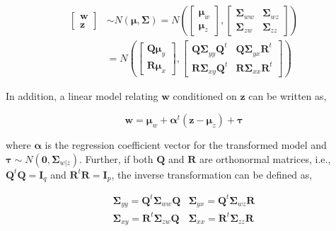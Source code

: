 \documentclass[review]{elsarticle}
\theoremstyle{definition}
\theoremstyle{definition}
\theoremstyle{remark}
\begin{document}
\begin{align}
  \begin{bmatrix}\mathbf{w} \\ 
  \mathbf{z}\end{bmatrix}  & \sim N \left(\boldsymbol{\mu}, \boldsymbol{\Sigma}\right)
  = N \left(
    \begin{bmatrix}
      \boldsymbol{\mu}_w \\ \boldsymbol{\mu}_z
    \end{bmatrix},
    \begin{bmatrix}
      \boldsymbol{\Sigma}_{ww} & \boldsymbol{\Sigma}_{wz} \\
      \boldsymbol{\Sigma}_{zw} & \boldsymbol{\Sigma}_{zz}
    \end{bmatrix} \right) \nonumber \\
  &= N \left(
    \begin{bmatrix}
      \boldsymbol{Q\mu}_y \\
      \boldsymbol{R\mu}_x
    \end{bmatrix},
    \begin{bmatrix}
      \boldsymbol{Q\Sigma}_{yy}\boldsymbol{Q}^t & \boldsymbol{Q\Sigma}_{yx}\mathbf{R}^t \\
      \boldsymbol{R\Sigma}_{xy}\boldsymbol{Q}^t & \boldsymbol{R\Sigma}_{xx}\mathbf{R}^t
    \end{bmatrix}
  \right)
  \label{eq:model3}
\end{align}

In addition, a linear model relating \(\mathbf{w}\) conditioned on
\(\mathbf{z}\) can be written as,

\begin{equation}
\mathbf{w} =    \boldsymbol{\mu}_w + \boldsymbol{\alpha}^t \left(\mathbf{z} - \boldsymbol{\mu}_z\right) + \boldsymbol{\tau}
\label{eq:latent-model}
\end{equation}

where \(\boldsymbol{\alpha}\) is the regression coefficient vector for
the transformed model and
\(\boldsymbol{\tau} \sim N\left(\mathbf{0}, \boldsymbol{\Sigma}_{w|z}\right)\).
Further, if both \(\mathbf{Q}\) and \(\mathbf{R}\) are orthonormal
matrices, i.e., \(\mathbf{Q}^t\mathbf{Q} = \mathbf{I}_q\) and
\(\mathbf{R}^t\mathbf{R} = \mathbf{I}_p\), the inverse transformation
can be defined as,

\begin{equation}
  \begin{matrix}
    \boldsymbol{\Sigma}_{yy} = \mathbf{Q}^t \boldsymbol{\Sigma}_{ww} \mathbf{Q} &
    \boldsymbol{\Sigma}_{yx} = \mathbf{Q}^t \boldsymbol{\Sigma}_{wz} \mathbf{R} \\
    \boldsymbol{\Sigma}_{xy} = \mathbf{R}^t \boldsymbol{\Sigma}_{zw} \mathbf{Q} &
    \boldsymbol{\Sigma}_{xx} = \mathbf{R}^t \boldsymbol{\Sigma}_{zz} \mathbf{R}
  \end{matrix}
  \label{eq:cov-yx-wz}
\end{equation}
\end{document}
